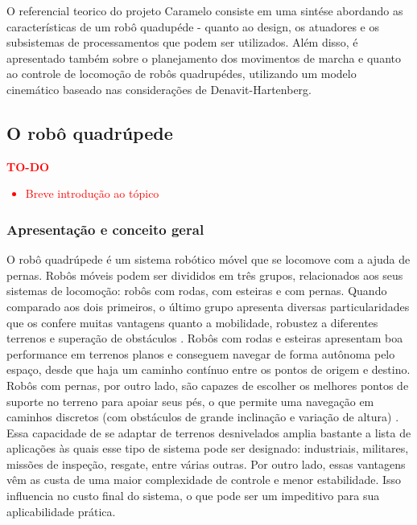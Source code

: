 \documentclass[../main.tex]{subfiles}
\begin{document}
  O referencial teorico do projeto Caramelo consiste em uma sintése abordando as características de um robô quadupéde - quanto ao design, os atuadores e os subsistemas de processamentos que podem ser utilizados. Além disso, é apresentado também sobre o planejamento dos movimentos de marcha e quanto ao controle de locomoção de robôs quadrupédes, utilizando um modelo cinemático baseado nas considerações de Denavit-Hartenberg.

  \subsection{O robô quadrúpede}
  \textcolor{red}{\textbf{TO-DO}
  \begin{itemize}
    \item Breve introdução ao tópico
  \end{itemize}
  }

  \subsubsection{Apresentação e conceito geral}
  O robô quadrúpede é um sistema robótico móvel que se locomove com a ajuda de pernas. Robôs móveis podem ser divididos em três grupos, relacionados aos seus sistemas de locomoção: robôs com rodas, com esteiras e com pernas. Quando comparado aos dois primeiros, o último grupo apresenta diversas particularidades que os confere muitas vantagens quanto a mobilidade, robustez a diferentes terrenos e superação de obstáculos \cite{Biswal2021}. Robôs com rodas e esteiras apresentam boa performance em terrenos planos e conseguem navegar de forma autônoma pelo espaço, desde que haja um caminho contínuo entre os pontos de origem e destino. Robôs com pernas, por outro lado, são capazes de escolher os melhores pontos de suporte no terreno para apoiar seus pés, o que permite uma navegação em caminhos discretos (com obstáculos de grande inclinação e variação de altura) \cite{Yao2021}. Essa capacidade de se adaptar de terrenos desnivelados amplia bastante a lista de aplicações às quais esse tipo de sistema pode ser designado: industriais, militares, missões de inspeção, resgate, entre várias outras. Por outro lado, essas vantagens vêm as custa de uma maior complexidade de controle e menor estabilidade. Isso influencia no custo final do sistema, o que pode ser um impeditivo para sua aplicabilidade prática. 
\end{document}
